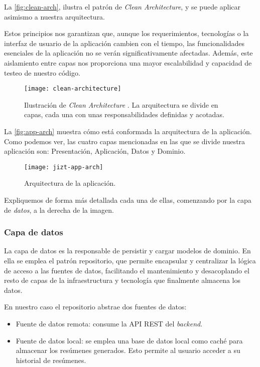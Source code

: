 La \autoref{fig:clean-arch}, ilustra el patrón de \emph{Clean Architecture}, y se puede aplicar asimismo a nuestra arquitectura.

Estos principios nos garantizan que, aunque los requerimientos, tecnologías o la interfaz de usuario de la aplicación cambien con el tiempo, las funcionalidades esenciales de la aplicación no se verán significativamente afectadas. Además, este aislamiento entre capas nos proporciona una mayor escalabilidad y capacidad de testeo de nuestro código.

\begin{figure}[!h]
	\centering
	\texttt{[image: clean-architecture]}
	\caption[Ilustración de \emph{Clean Architecture}.]{Ilustración de \emph{Clean Architecture} \cite{martin15}. La arquitectura se divide en capas, cada una con unas responsabilidades definidas y acotadas.}
	\label{fig:clean-arch}
\end{figure}


La \autoref{fig:app-arch} muestra cómo está conformada la arquitectura de la aplicación. Como podemos ver, las cuatro capas mencionadas en las que se divide nuestra aplicación son: Presentación, Aplicación, Datos y Dominio.

\begin{figure}[!h]
	\centering
	\texttt{[image: jizt-app-arch]}
	\caption{Arquitectura de la aplicación.}
	\label{fig:app-arch}
\end{figure}

Expliquemos de forma más detallada cada una de ellas, comenzando por la capa de \emph{datos}, a la derecha de la imagen.

\subsubsection{Capa de datos}

La capa de datos es la responsable de persistir y cargar modelos de dominio. En ella se emplea el patrón repositorio, que permite encapsular y centralizar la lógica de acceso a las fuentes de datos, facilitando el mantenimiento y desacoplando el resto de capas de la infraestructura y tecnología que finalmente almacena los datos.

En nuestro caso el repositorio abstrae dos fuentes de datos:

\vspace{-0.3cm}
\begin{itemize} [\textbullet]
	\item Fuente de datos remota: consume la API REST del \emph{backend}.
	
	\item Fuente de datos local: se emplea una base de datos local como caché para almacenar los resúmenes generados. Esto permite al usuario acceder a su historial de resúmenes.
\end{itemize}

